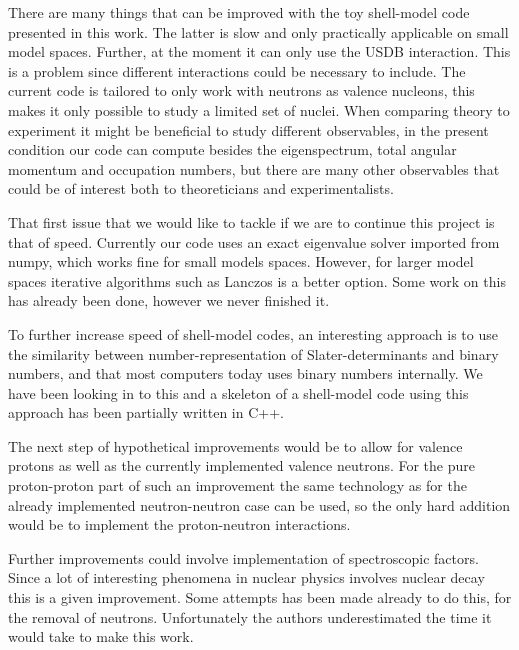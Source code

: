 There are many things that can be improved with the toy shell-model code presented in this work. The latter is slow and only practically applicable on small model spaces. Further, at the moment it can only use the USDB interaction. This is a problem since different interactions could be necessary to include. The current code is tailored to only work with neutrons as valence nucleons, this makes it only possible to study a limited set of nuclei. When comparing theory to experiment it might be beneficial to study different observables, in the present condition our code can compute besides the eigenspectrum, total angular momentum and occupation numbers, but there are many other observables that could be of interest both to theoreticians and experimentalists.

That first issue that we would like to tackle if we are to continue this project is that of speed.
Currently our code uses an exact eigenvalue solver imported from numpy, which works fine for small models spaces. However, for larger model spaces iterative algorithms such as Lanczos is a better option. Some work on this has already been done, however we never finished it.

To further increase speed of shell-model codes, an interesting approach is to use the similarity between number-representation of Slater-determinants and binary numbers, and that most computers today uses binary numbers internally. We have been looking in to this and a skeleton of a shell-model code using this approach has been partially written in C++.

The next step of hypothetical improvements would be to allow for valence protons as well as the currently implemented valence neutrons. For the pure proton-proton part of such an improvement the same technology as for the already implemented neutron-neutron case can be used, so the only hard addition would be to implement the proton-neutron interactions.

Further improvements could involve implementation of spectroscopic factors. Since a lot of interesting phenomena in nuclear physics involves nuclear decay this is a given improvement. Some attempts has been made already to do this, for the removal of neutrons. Unfortunately the authors underestimated the time it would take to make this work.

